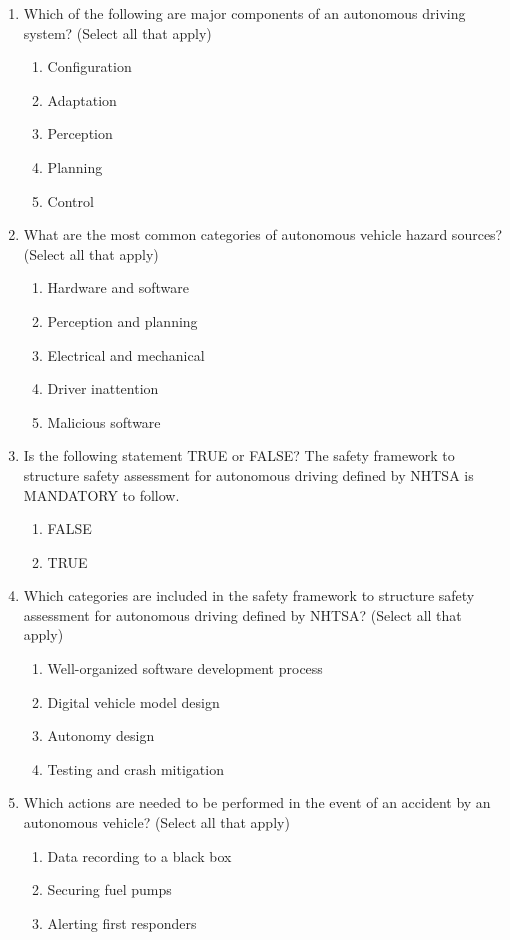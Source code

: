 \begin{enumerate}
\item Which of the following are major components of an autonomous driving system? (Select all that apply)
	\begin{enumerate}
		\item Configuration
		\item Adaptation
		\item Perception
		\item Planning
		\item Control
	\end{enumerate}
\item What are the most common categories of autonomous vehicle hazard sources? (Select all that apply)
	\begin{enumerate}
		\item Hardware and software
		\item Perception and planning
		\item Electrical and mechanical
		\item Driver inattention
		\item Malicious software
	\end{enumerate}
\item Is the following statement TRUE or FALSE?
		The safety framework to structure safety assessment for autonomous driving defined by NHTSA is MANDATORY to follow.
	\begin{enumerate}
		\item FALSE
		\item TRUE
	\end{enumerate}
\item Which categories are included in the safety framework to structure safety assessment for autonomous driving defined by NHTSA? (Select all that apply)
	\begin{enumerate}
		\item Well-organized software development process
		\item Digital vehicle model design
		\item Autonomy design
		\item Testing and crash mitigation
	\end{enumerate}
\item Which actions are needed to be performed in the event of an accident by an autonomous vehicle? (Select all that apply)
	\begin{enumerate}
		\item Data recording to a black box
		\item Securing fuel pumps
		\item Alerting first responders

\end{enumerate}
\end{enumerate}
